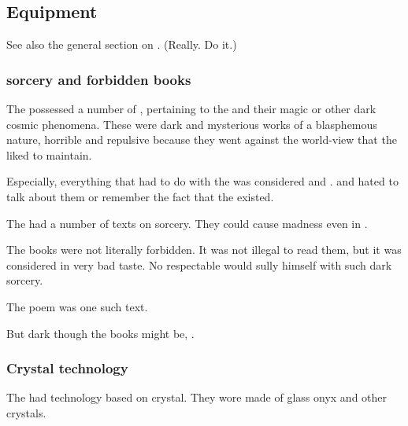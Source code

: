 \subsection{Equipment}
See also the general section on . 
(Really. Do it.)





\subsubsection{\Bane sorcery and forbidden books}
The \resphain possessed a number of , pertaining to the \SitraAchras and their magic or other dark cosmic phenomena. 
These were dark and mysterious works of a blasphemous nature, horrible and repulsive because they went against the world-view that the \resphain liked to maintain. 

Especially, everything that had to do with the \SitraAchras was considered  and . 
 and hated to talk about them or remember the fact that the \banes existed.

The \resphain had a number of texts on \SitraAchra sorcery.
They could cause madness even in \resphain.

The books were not literally forbidden. 
It was not illegal to read them, but it was considered in very bad taste. 
No respectable \resphan would sully himself with such dark sorcery. 

The poem \WanderersInDarknessEmph was one such  text. 

But dark though the \pps{\resphain} books might be, . 





\subsubsection{Crystal technology}
The \resphain{} had technology based on crystal. 
They wore \armour made of glass onyx and other crystals. 





